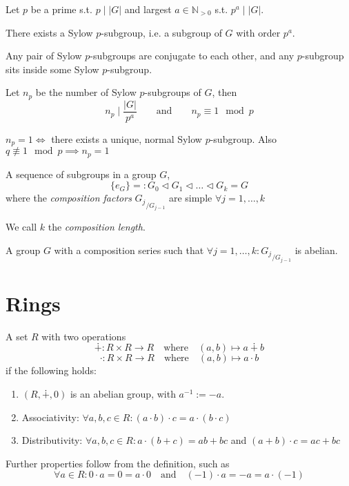 Let \(p\) be a prime s.t. \(p \mid \lvert G\rvert\) and largest \(a \in \mathbb{N}_{>0}\) s.t. \(p^a \mid \lvert G\rvert\).
\begin{theorem}
   There exists a Sylow \(p\)-subgroup, i.e. a subgroup of \(G\) with order \(p^a\).
\end{theorem}
\begin{theorem}
   Any pair of Sylow \(p\)-subgroups are conjugate to each other, and any \(p\)-subgroup sits inside some Sylow \(p\)-subgroup.
\end{theorem}
\begin{theorem}
   Let \(n_p\) be the number of Sylow \(p\)-subgroups of \(G\), then
   \[n_p \mid \frac{|G|}{p^a} \qquad\text{and}\qquad n_p \equiv 1 \mod p\]
\end{theorem}
\begin{remark}
   \(n_p = 1 \iff\) there exists a unique, normal Sylow \(p\)-subgroup.
   Also \(q \not\equiv 1 \mod p \implies n_p = 1\)
\end{remark}

\begin{definition}
   A sequence of subgroups in a group \(G\),
   \[\{e_G\} =: G_0 \triangleleft G_1 \triangleleft \ldots \triangleleft G_k = G\]
   where the \emph{composition factors} \({G_j}_{/G_{j-1}}\) are simple \(\forall j = 1, \ldots, k\)
\end{definition}
\begin{remark}
   We call \(k\) the \emph{composition length}.
\end{remark}

\begin{definition}
   A group \(G\) with a composition series such that \(\forall j = 1, \ldots, k: {G_j}_{/G_{j-1}}\) is abelian.
\end{definition}

\section{Rings}
\begin{definition}[Ring]
   A set \(R\) with two operations
   \[\dotplus: R \times R \to R \quad\text{where}\quad (a, b) \mapsto a \dotplus b\]
   \[\cdot: R \times R \to R \quad\text{where}\quad (a, b) \mapsto a \cdot b\]
   if the following holds:
   \begin{enumerate}[label=\roman*, align=Center]
      \item \((R, \dotplus, 0)\) is an abelian group, with \(a^{-1} := -a\).
      \item Associativity: \(\forall a, b, c \in R: (a \cdot b) \cdot c = a \cdot (b \cdot c)\)
      \item Distributivity: \(\forall a, b, c \in R: a \cdot (b + c) = ab + bc\) and \((a + b) \cdot c = ac + bc\)
   \end{enumerate}
\end{definition}
\begin{remark}
   Further properties follow from the definition, such as
   \[\forall a \in R: 0 \cdot a = 0 = a \cdot 0 \quad\text{and}\quad (-1) \cdot a = -a = a \cdot (-1)\]
\end{remark}


